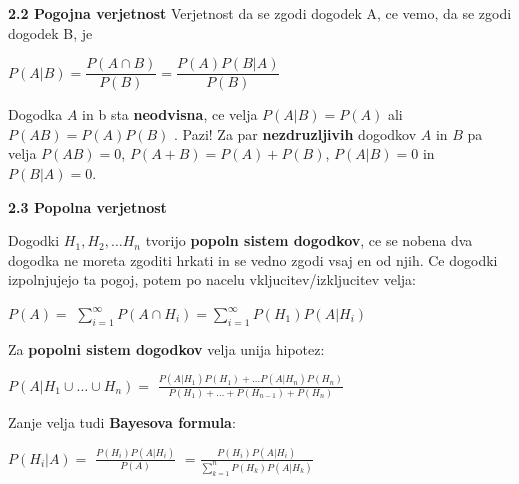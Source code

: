 \documentclass{article}
\begin{document}
\begin{multicols}{3}
\textbf{2.2 Pogojna verjetnost}
Verjetnost da se zgodi dogodek A, ce vemo, da se zgodi dogodek B, je
\begin{center}
    \begin{math}
        P(A | B) = \dfrac{P(A \cap B)}{P(B)} = \dfrac{P(A)P(B|A)}{P(B)}
    \end{math}
\end{center}
Dogodka $A$ in b sta \textbf{neodvisna}, ce velja $P(A | B) = P(A)$ ali
$P(A B) = P(A)P(B)$ .
Pazi! Za par \textbf{nezdruzljivih} dogodkov $A$ in $B$
pa velja $P(AB) = 0$,  $P(A + B) = P(A) + P(B)$, $P(A|B) = 0$ in $P(B|A) = 0$.

\textbf{2.3 Popolna verjetnost}

Dogodki $H_{1}, H_{2}, \dots H_{n}$ tvorijo \textbf{popoln sistem dogodkov},
ce se nobena dva dogodka ne moreta zgoditi hrkati in se vedno
zgodi vsaj en od njih. Ce dogodki izpolnjujejo ta pogoj, potem po
nacelu vkljucitev/izkljucitev velja:
\begin{center}
    \begin{math}
        P(A) =
    \end{math}
    \smallskip
    \begin{math}
        \sum_{i=1}^{\infty} P(A \cap H_{i}) =
        \sum_{i=1}^{\infty} P(H_{1}) P(A | H_{i})
    \end{math}
\end{center}
Za \textbf{popolni sistem dogodkov} velja unija hipotez:
\begin{center}
    \begin{math}
        P(A|H_{1} \cup \dots \cup H_{n}) = 
    \end{math}
    \bigskip
    \begin{math}
        \frac{
            P(A | H_{1}) P(H_{1}) + \dots
            P(A | H_{n}) P(H_{n})
        }
        {
            P(H_{1}) + \dots + P(H_{n - 1}) + P(H_{n})
        }
    \end{math}    
\end{center}
Zanje velja tudi \textbf{Bayesova formula}:
\begin{center}
    \begin{math}
        P(H_{i} | A) = 
    \end{math}
    \begin{math}
        \frac{
            P(H_{i}) P(A | H_{i})
        }
        {
            P(A)
        }
    \end{math}
    \begin{math}
        = \frac{
            P(H_{i}) P(A | H_{i})
        }
        {
            \sum_{k=1}^{n} P(H_{k}) P(A | H_{k})
        }
    \end{math}        
\end{center}


\end{multicols}
\end{document}
